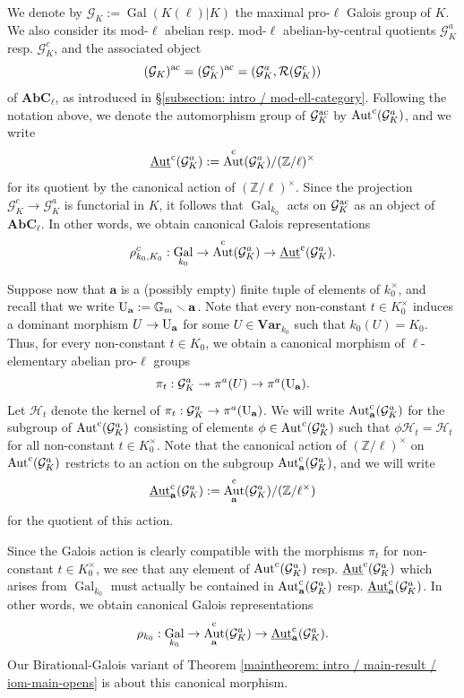 \documentclass[11pt]{amsart}
\theoremstyle{definition}
\theoremstyle{remark}
\numberwithin{equation}{section}
\DeclareMathOperator{\Aut}{Aut}
\DeclareMathOperator{\Gal}{Gal}
\newcommand{\Z}{\mathbb{Z}}
\newcommand{\U}{{\rm U}}
\newcommand{\Gbb}{\mathbb{G}}
\newcommand{\Gc}{\mathcal{G}}
\newcommand{\Rcal}{\mathcal{R}}
\newcommand{\Hcal}{\mathcal{H}}
\newcommand{\abf}{\mathbf{a}}
\newcommand{\Autc}{\Aut^{\rm c}}
\newcommand{\UAutc}{\underline{\Aut}^{\rm c}}
\newcommand{\Var}{\mathbf{Var}}
\newcommand{\AbC}{\mathbf{AbC}_{\ell}}
\newcommand{\ac}{{\rm ac}}
\newcommand{\Galk}{{\Gal_{k_0}}}
\begin{document}
We denote by $\Gc_K := \Gal(K(\ell)|K)$ the maximal pro-$\ell$ Galois group of $K$.
We also consider its mod-$\ell$ abelian resp. mod-$\ell$ abelian-by-central quotients $\Gc_K^a$ resp. $\Gc_K^c$, and the associated object 
\[ (\Gc_K)^\ac = (\Gc_K^c)^\ac = (\Gc_K^a,\Rcal(\Gc_K^c)) \]
of $\AbC$, as introduced in \S\ref{subsection: intro / mod-ell-category}.
Following the notation above, we denote the automorphism group of $\Gc_K^\ac$ by $\Autc(\Gc_K^a)$, and we write
\[ \UAutc(\Gc_K^a) := \Autc(\Gc_K^a)/(\Z/\ell)^\times \]
for its quotient by the canonical action of $(\Z/\ell)^\times$.
Since the projection $\Gc_K^c \rightarrow \Gc_K^a$ is functorial in $K$, it follows that $\Galk$ acts on $\Gc_K^\ac$ as an object of $\AbC$.
In other words, we obtain canonical Galois representations
\[ \rho^c_{k_0,K_0} : \Galk \rightarrow \Autc(\Gc_K^a) \rightarrow \UAutc(\Gc_K^a). \]

Suppose now that $\abf$ is a (possibly empty) finite tuple of elements of $k_0^\times$, and recall that we write $\U_\abf := \Gbb_m \smallsetminus \abf$.
Note that every non-constant $t \in K_0^\times$ induces a dominant morphism $U \rightarrow \U_\abf$ for some $U \in \Var_{k_0}$ such that $k_0(U) = K_0$.
Thus, for every non-constant $t \in K_0$, we obtain a canonical morphism of $\ell$-elementary abelian pro-$\ell$ groups
\[ \pi_t : \Gc_K^a \twoheadrightarrow \pi^a(U) \rightarrow \pi^a(\U_\abf). \]
Let $\Hcal_t$ denote the kernel of $\pi_t : \Gc_K^a \rightarrow \pi^a(\U_\abf)$.
We will write $\Autc_\abf(\Gc_K^a)$ for the subgroup of $\Autc(\Gc_K^a)$ consisting of elements $\phi \in \Autc(\Gc_K^a)$ such that $\phi\Hcal_t = \Hcal_t$ for all non-constant $t \in K_0^\times$.
Note that the canonical action of $(\Z/\ell)^\times$ on $\Autc(\Gc_K^a)$ restricts to an action on the subgroup $\Autc_\abf(\Gc_K^a)$, and we will write 
\[ \UAutc_\abf(\Gc_K^a) := \Autc_\abf(\Gc_K^a)/(\Z/\ell^\times) \]
for the quotient of this action.

Since the Galois action is clearly compatible with the morphisms $\pi_t$ for non-constant $t \in K_0^\times$, we see that any element of $\Autc(\Gc_K^a)$ resp. $\UAutc(\Gc_K^a)$ which arises from $\Galk$ must actually be contained in $\Autc_\abf(\Gc_K^a)$ resp. $\UAutc_\abf(\Gc_K^a)$.
In other words, we obtain canonical Galois representations
\[ \rho_{k_0} : \Galk \rightarrow \Autc_\abf(\Gc_K^a) \rightarrow \UAutc_\abf(\Gc_K^a). \]
Our Birational-Galois variant of Theorem \ref{maintheorem: intro / main-result / iom-main-opens} is about this canonical morphism.
\end{document}
